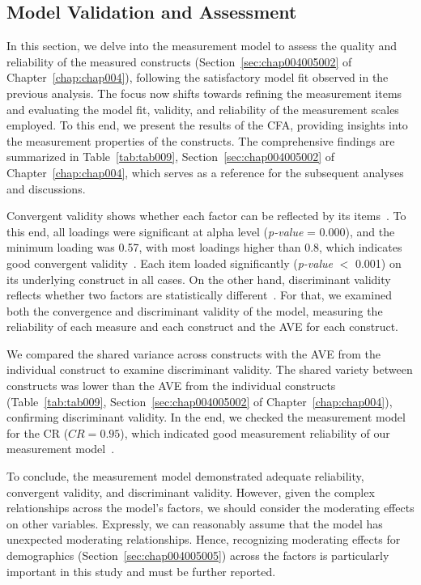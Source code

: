 \subsection{Model Validation and Assessment}
\label{chap:app002004002}

In this section, we delve into the measurement model to assess the quality and reliability of the measured constructs (Section~\ref{sec:chap004005002} of Chapter~\ref{chap:chap004}), following the satisfactory model fit observed in the previous analysis.
The focus now shifts towards refining the measurement items and evaluating the model fit, validity, and reliability of the measurement scales employed.
To this end, we present the results of the \ac{CFA}, providing insights into the measurement properties of the constructs.
The comprehensive findings are summarized in \textcolor{revised}{Table~\ref{tab:tab009}, Section~\ref{sec:chap004005002} of Chapter~\ref{chap:chap004}}, which serves as a reference for the subsequent analyses and discussions.

Convergent validity shows whether each factor can be reflected by its items~\cite{CALISTO2022102922}.
To this end, all loadings were significant at alpha level ({\it p-value} = 0.000), and the minimum loading was 0.57, with most loadings higher than 0.8, which indicates good convergent validity~\cite{CALISTO2022102922}.
Each item loaded significantly ({\it p-value} $<$ 0.001) on its underlying construct in all cases.
On the other hand, discriminant validity reflects whether two factors are statistically different~\cite{CALISTO2022102922}.
For that, we examined both the convergence and discriminant validity of the model, measuring the reliability of each measure and each construct and the \ac{AVE} for each construct.

We compared the shared variance across constructs with the \ac{AVE} from the individual construct to examine discriminant validity.
The shared variety between constructs was lower than the \ac{AVE} from the individual constructs \textcolor{revised}{(Table~\ref{tab:tab009}, Section~\ref{sec:chap004005002} of Chapter~\ref{chap:chap004})}, confirming discriminant validity.
In the end, we checked the measurement model for the \acl{CR} ($CR = 0.95$), which indicated good measurement reliability of our measurement model~\cite{doi:10.1504/IJMDA.2017.087624, SUMAK2016602}.

To conclude, the measurement model demonstrated adequate reliability, convergent validity, and discriminant validity.
However, given the complex relationships across the model's factors, we should consider the moderating effects on other variables.
Expressly, we can reasonably assume that the model has unexpected moderating relationships.
Hence, recognizing moderating effects for demographics (Section~\ref{sec:chap004005005}) across the factors is particularly important in this study and must be further reported.

